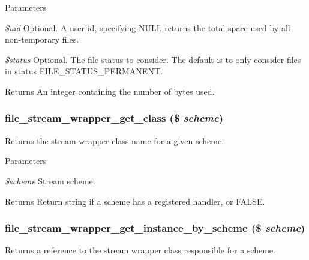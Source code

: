 \begin{DoxyParams}{Parameters}
\item[{\em \$uid}]Optional. A user id, specifying NULL returns the total space used by all non-\/temporary files. \item[{\em \$status}]Optional. The file status to consider. The default is to only consider files in status FILE\_\-STATUS\_\-PERMANENT.\end{DoxyParams}
\begin{DoxyReturn}{Returns}
An integer containing the number of bytes used. 
\end{DoxyReturn}
\hypertarget{group__file_gaa31faf56baba0315a1867e2c1cc2b842}{
\subsubsection[{file\_\-stream\_\-wrapper\_\-get\_\-class}]{\setlength{\rightskip}{0pt plus 5cm}file\_\-stream\_\-wrapper\_\-get\_\-class (\$ {\em scheme})}}
\label{group__file_gaa31faf56baba0315a1867e2c1cc2b842}
Returns the stream wrapper class name for a given scheme.


\begin{DoxyParams}{Parameters}
\item[{\em \$scheme}]Stream scheme.\end{DoxyParams}
\begin{DoxyReturn}{Returns}
Return string if a scheme has a registered handler, or FALSE. 
\end{DoxyReturn}
\hypertarget{group__file_ga6b037293e4cfecbabbd8db32191778a5}{
\subsubsection[{file\_\-stream\_\-wrapper\_\-get\_\-instance\_\-by\_\-scheme}]{\setlength{\rightskip}{0pt plus 5cm}file\_\-stream\_\-wrapper\_\-get\_\-instance\_\-by\_\-scheme (\$ {\em scheme})}}
\label{group__file_ga6b037293e4cfecbabbd8db32191778a5}
Returns a reference to the stream wrapper class responsible for a scheme.


